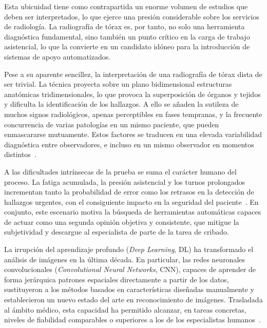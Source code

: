 Esta ubicuidad tiene como contrapartida un enorme volumen de estudios que deben
ser interpretados, lo que ejerce una presión considerable sobre los servicios de
radiología. La radiografía de tórax es, por tanto, no solo una herramienta
diagnóstica fundamental, sino también un punto crítico en la carga de trabajo
asistencial, lo que la convierte en un candidato idóneo para la introducción de
sistemas de apoyo automatizados.


Pese a su aparente sencillez, la interpretación de una radiografía de tórax dista
de ser trivial. La técnica proyecta sobre un plano bidimensional estructuras
anatómicas tridimensionales, lo que provoca la superposición de órganos y
tejidos y dificulta la identificación de los hallazgos. A ello se añaden la
sutileza de muchos signos radiológicos, apenas perceptibles en fases tempranas, y
la frecuente concurrencia de varias patologías en un mismo paciente, que pueden
enmascararse mutuamente. Estos factores se traducen en una elevada variabilidad
diagnóstica entre observadores, e incluso en un mismo observador en momentos
distintos~\cite{rajpurkarCheXNetRadiologistLevel2017, lizEnsemblesConvolutional2021}.

A las dificultades intrínsecas de la prueba se suma el carácter humano del
proceso. La fatiga acumulada, la presión asistencial y los turnos prolongados
incrementan tanto la probabilidad de error como los retrasos en la detección de
hallazgos urgentes, con el consiguiente impacto en la seguridad del
paciente~\cite{lizDeepLearningMultilabel2023}. En conjunto, este escenario motiva
la búsqueda de herramientas automáticas capaces de actuar como una segunda
opinión objetiva y consistente, que mitigue la subjetividad y descargue al
especialista de parte de la tarea de cribado.


La irrupción del aprendizaje profundo (\textit{Deep Learning}, DL) ha
transformado el análisis de imágenes en la última década. En particular, las
redes neuronales convolucionales (\textit{Convolutional Neural Networks}, CNN),
capaces de aprender de forma jerárquica patrones espaciales directamente a partir
de los datos, sustituyeron a los métodos basados en características diseñadas
manualmente y establecieron un nuevo estado del arte en reconocimiento de
imágenes. Trasladada al ámbito médico, esta capacidad ha permitido alcanzar, en
tareas concretas, niveles de fiabilidad comparables o superiores a los de los
especialistas humanos~\cite{rajpurkarCheXNetRadiologistLevel2017, irvinCheXpertLargeChest2019, kermanyIdentifyingMedical2018}.

